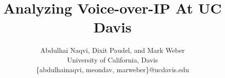 \documentclass[letterpaper,twocolumn,10pt]{article}
\date{}
\begin{document}
\title{ Analyzing Voice-over-IP At UC Davis}
\author{Abdulhai Naqvi, Dixit Paudel, and Mark Weber\\
University of California, Davis\\
\{abdulhainaqvi, meondav, marweber\}@ucdavis.edu}
\maketitle

















\end{document}
